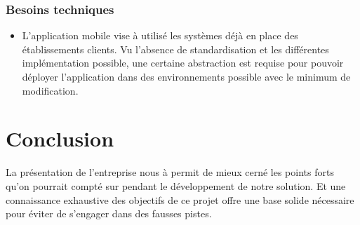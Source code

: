 \subsubsection{Besoins techniques}
\begin{itemize}

\item L'application mobile vise à utilisé les systèmes déjà en place des
établissements clients. Vu l'absence de standardisation et les
différentes implémentation possible, une certaine abstraction est
requise pour pouvoir déployer l'application dans des environnements
possible avec le minimum de modification.

\end{itemize}

\section{Conclusion} 

La présentation de l'entreprise nous à permit de mieux cerné les points forts
qu'on pourrait compté sur pendant le développement de notre solution. Et une
connaissance exhaustive des objectifs de ce projet offre une base solide
nécessaire pour éviter de s’engager dans des fausses pistes.
